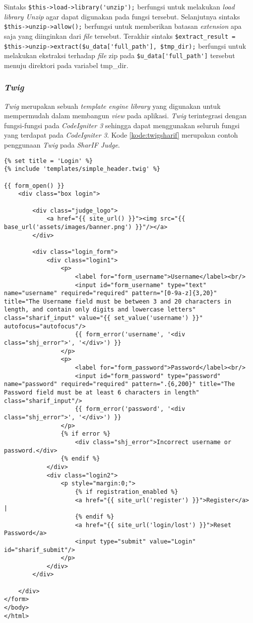 Sintaks \verb|$this->load->library('unzip');| berfungsi untuk melakukan \textit{load} \textit{library Unzip} agar dapat digunakan pada fungsi tersebut. Selanjutnya sintaks \verb|$this->unzip->allow();| berfungsi untuk memberikan batasan \textit{extension} apa saja yang diinginkan dari \textit{file} tersebut. Terakhir sintaks \verb|$extract_result = $this->unzip->extract($u_data['full_path'], $tmp_dir);| berfungsi untuk melakukan ekstraksi terhadap \textit{file} zip pada \verb|$u_data['full_path']| tersebut menuju direktori pada variabel tmp\_dir.

\subsubsection{\textit{Twig}}
\textit{Twig} merupakan sebuah \textit{template engine library} yang digunakan untuk mempermudah dalam membangun \textit{view} pada aplikasi. \textit{Twig} terintegrasi dengan fungsi-fungsi pada \textit{CodeIgniter 3} sehingga dapat menggunakan seluruh fungsi yang terdapat pada \textit{CodeIgniter 3}. Kode \ref{kode:twigsharif} merupakan contoh penggunaan \textit{Twig} pada \textit{SharIF Judge}.
\begin{lstlisting}[caption=Contoh \textit{view} menggunakan \textit{library Twig}, label=kode:twigsharif]
{% set title = 'Login' %}
{% include 'templates/simple_header.twig' %}

{{ form_open() }}
	<div class="box login">

		<div class="judge_logo">
			<a href="{{ site_url() }}"><img src="{{ base_url('assets/images/banner.png') }}"/></a>
		</div>

		<div class="login_form">
			<div class="login1">
				<p>
					<label for="form_username">Username</label><br/>
					<input id="form_username" type="text" name="username" required="required" pattern="[0-9a-z]{3,20}" title="The Username field must be between 3 and 20 characters in length, and contain only digits and lowercase letters" class="sharif_input" value="{{ set_value('username') }}" autofocus="autofocus"/>
					{{ form_error('username', '<div class="shj_error">', '</div>') }}
				</p>
				<p>
					<label for="form_password">Password</label><br/>
					<input id="form_password" type="password" name="password" required="required" pattern=".{6,200}" title="The Password field must be at least 6 characters in length" class="sharif_input"/>
					{{ form_error('password', '<div class="shj_error">', '</div>') }}
				</p>
				{% if error %}
					<div class="shj_error">Incorrect username or password.</div>
				{% endif %}
			</div>
			<div class="login2">
				<p style="margin:0;">
					{% if registration_enabled %}
					<a href="{{ site_url('register') }}">Register</a> |
					{% endif %}
					<a href="{{ site_url('login/lost') }}">Reset Password</a>
					<input type="submit" value="Login" id="sharif_submit"/>
				</p>
			</div>
		</div>

	</div>
</form>
</body>
</html>
\end{lstlisting}

